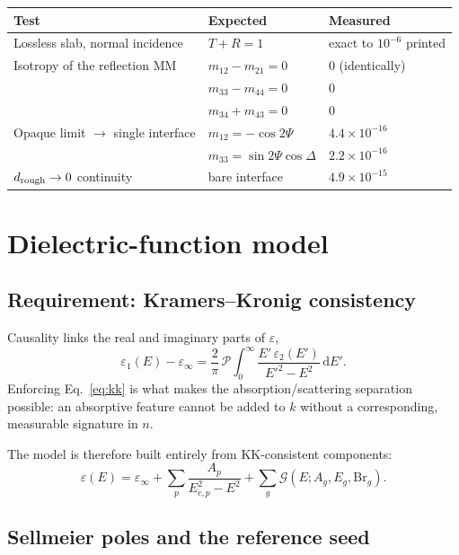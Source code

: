 \documentclass[11pt,a4paper]{article}
\newcommand{\epsm}{\varepsilon}
\begin{document}
\begin{center}\small
\begin{tabular}{@{}lll@{}}
\toprule
Test & Expected & Measured \\
\midrule
Lossless slab, normal incidence & $T+R=1$ & exact to $10^{-6}$ printed \\
Isotropy of the reflection MM & $m_{12}\!-\!m_{21}=0$ & $0$ (identically) \\
& $m_{33}\!-\!m_{44}=0$ & $0$ \\
& $m_{34}\!+\!m_{43}=0$ & $0$ \\
Opaque limit $\to$ single interface & $m_{12}=-\cos2\Psi$ & $4.4\times10^{-16}$ \\
& $m_{33}=\sin2\Psi\cos\Delta$ & $2.2\times10^{-16}$ \\
$d_{\rm rough}\to0$ continuity & bare interface & $4.9\times10^{-15}$ \\
\bottomrule
\end{tabular}
\end{center}

\section{Dielectric-function model}

\subsection{Requirement: Kramers--Kronig consistency}

Causality links the real and imaginary parts of $\epsm$,
\begin{equation}
\epsm_1(E)-\epsm_\infty=\frac{2}{\pi}\,\mathcal{P}\!\!\int_0^\infty
\frac{E'\,\epsm_2(E')}{E'^2-E^2}\,\mathrm{d}E' .
\label{eq:kk}
\end{equation}
Enforcing Eq.~\eqref{eq:kk} is what makes the absorption/scattering separation
possible: an absorptive feature cannot be added to $k$ without a corresponding,
measurable signature in $n$.

The model is therefore built entirely from KK-consistent components:
\begin{equation}
\epsm(E)=\epsm_\infty
+\sum_p \frac{A_p}{E_{c,p}^2-E^2}
+\sum_g \mathcal{G}(E;A_g,E_g,\mathrm{Br}_g).
\end{equation}

\subsection{Sellmeier poles and the reference seed}
\end{document}
